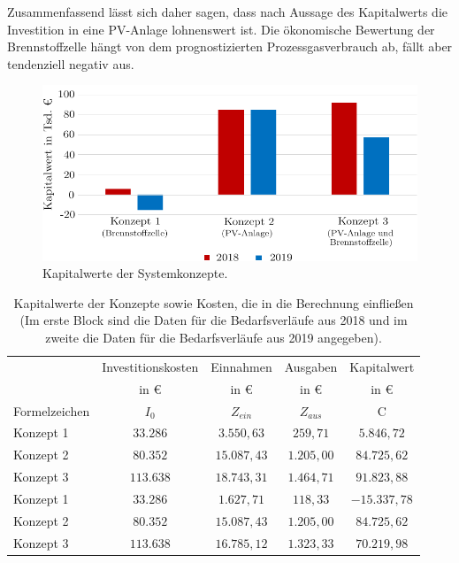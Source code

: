 Zusammenfassend lässt sich daher sagen, dass nach Aussage des Kapitalwerts die Investition in eine PV-Anlage lohnenswert ist. Die ökonomische Bewertung der Brennstoffzelle hängt von dem prognostizierten Prozessgasverbrauch ab, fällt aber tendenziell negativ aus.

\begin{figure}[h]
	\centering
		\includegraphics[scale=1]{Figures/Kapitalwerte}
		\caption{Kapitalwerte der Systemkonzepte.}
\label{fig:Kapitalwerte}	
\end{figure}

\begin{table}[htb]
		\centering
		\caption{Kapitalwerte der Konzepte sowie Kosten, die in die Berechnung einfließen (Im erste Block sind die Daten für die Bedarfsverläufe aus 2018 und im zweite die Daten für die Bedarfsverläufe aus 2019 angegeben).}
		\begin{tabular}{l c c c c}
		\toprule
		 & Investitionskosten & Einnahmen & Ausgaben & Kapitalwert\\
		& in € & in € & in € & in €\\
		Formelzeichen & $I_0$ & $Z_{ein}$ & $Z_{aus}$ & C\\
		\midrule
		Konzept 1 & $ 33.286$ & $ 3.550,63$ & $  259,71$ & $ 5.846,72$\\
		Konzept 2 & $ 80.352$ & $15.087,43$ & $1.205,00$ & $84.725,62$\\
		Konzept 3 & $113.638$ & $18.743,31$ & $1.464,71$ & $91.823,88$\\
		\midrule
		Konzept 1 & $ 33.286$ & $ 1.627,71$ & $  118,33$ & $-15.337,78$\\
		Konzept 2 & $ 80.352$ & $15.087,43$ & $1.205,00$ & $ 84.725,62$\\
		Konzept 3 & $113.638$ & $16.785,12$ & $1.323,33$ & $ 70.219,98$\\
		\bottomrule
		\end{tabular}
		\label{tb:Kapitalwerte}
\end{table}	

